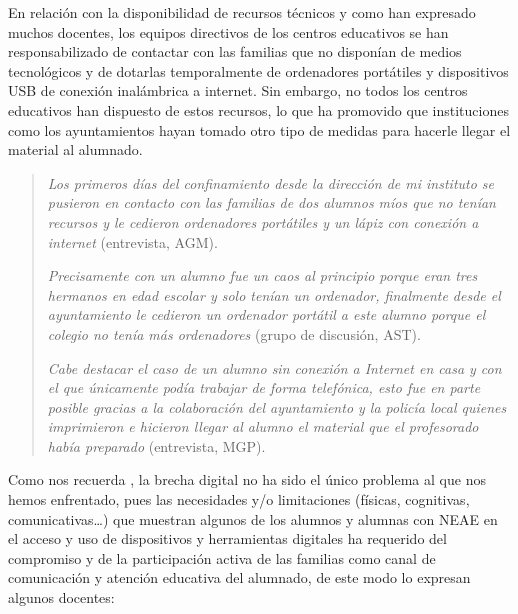 \documentclass[spanish]{textolivre}
\begin{document}
En relación con la disponibilidad de recursos técnicos y como han expresado muchos docentes, los equipos directivos de los centros educativos se han responsabilizado de contactar con las familias que no disponían de medios tecnológicos y de dotarlas temporalmente de ordenadores portátiles y dispositivos USB de conexión inalámbrica a internet. Sin embargo, no todos los centros educativos han dispuesto de estos recursos, lo que ha promovido que instituciones como los ayuntamientos hayan tomado otro tipo de medidas para hacerle llegar el material al alumnado.

\begin{quote}
\emph{Los primeros días del confinamiento desde la dirección de mi instituto se pusieron en contacto con las familias de dos alumnos míos que no tenían recursos y le cedieron ordenadores portátiles y un lápiz con conexión a internet} (entrevista, AGM). 

\emph{Precisamente con un alumno fue un caos al principio porque eran tres hermanos en edad escolar y solo tenían un ordenador, finalmente desde el ayuntamiento le cedieron un ordenador portátil a este alumno porque el colegio no tenía más ordenadores} (grupo de discusión, AST).

\emph{Cabe destacar el caso de un alumno sin conexión a Internet en casa y con el que únicamente podía trabajar de forma telefónica, esto fue en parte posible gracias a la colaboración del ayuntamiento y la policía local quienes imprimieron e hicieron llegar al alumno el material que el profesorado había preparado} (entrevista, MGP).
\end{quote}

Como nos recuerda \textcite{mur2016}, %
la brecha digital no ha sido el único problema al que nos hemos enfrentado, pues las necesidades y/o limitaciones (físicas, cognitivas, comunicativas…) que muestran algunos de los alumnos y alumnas con NEAE en el acceso y uso de dispositivos y herramientas digitales ha requerido del compromiso y de la participación activa de las familias como canal de comunicación y atención educativa del alumnado, de este modo lo expresan algunos docentes:
\end{document}
